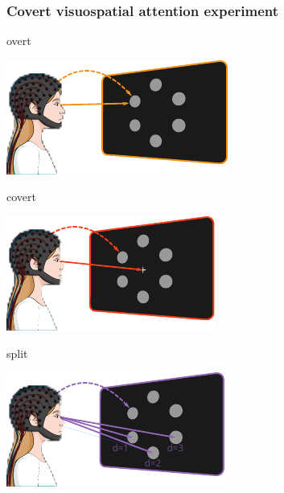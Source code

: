 \documentclass{kul-ulille-beamer}
\begin{document}
\begin{frame}
  \frametitle{Covert visuospatial attention experiment \\
    {\tiny\cite{VanDenKerchove2024}}}
    \centering

    \small
    \begin{minipage}{.6\textwidth}
    \begin{minipage}{.3\textwidth}
      overt
      \smallskip

      \includegraphics[width=\textwidth]{figures/covert/attention_overt.pdf}
    \end{minipage}\hfill%
    \begin{minipage}{.3\textwidth}
      covert
      \smallskip

      \includegraphics[width=\textwidth]{figures/covert/attention_covert.pdf}
    \end{minipage}\hfill%
    \begin{minipage}{.3\textwidth}
      \small
      split
      \smallskip

      \includegraphics[width=\textwidth]{figures/covert/attention_split.pdf}
    \end{minipage}%
    \end{minipage}
    \bigskip



\end{frame}
\end{document}
